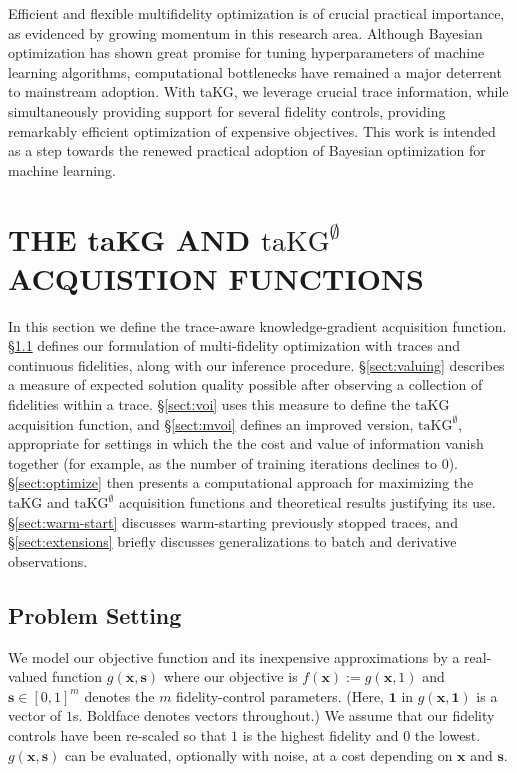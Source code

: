 \documentclass[letterpaper]{article}
\let\Section\S
\newcommand{\x}{\mathbf{x}}
\newcommand{\s}{\mathbf{s}}
\renewcommand{\S}{S}
\newcommand{\one}{\mathbf{1}}
\newcommand{\taKG}{\text{taKG}}
\newcommand{\taKGE}{\text{taKG}^\emptyset}
\numberwithin{equation}{section}
\newcommand{\sectn}[1]{\Section\ref{#1}}
\begin{document}

Efficient and flexible multifidelity optimization is of crucial practical importance, as evidenced by growing momentum in this research area. Although Bayesian optimization has shown great promise for tuning hyperparameters of machine learning algorithms, computational bottlenecks have remained a major deterrent to mainstream adoption. With taKG, we leverage crucial trace information, while simultaneously providing support for several fidelity controls, providing remarkably efficient optimization of expensive objectives. This work is intended as a step towards the renewed practical adoption of Bayesian optimization for machine learning.

\section{THE taKG AND $\taKGE$ ACQUISTION FUNCTIONS}
\label{sect:taKG}
In this section we define the trace-aware knowledge-gradient acquisition function.
\sectn{sec:obj} defines our formulation of multi-fidelity optimization with traces and continuous fidelities, along with our inference procedure.
\sectn{sect:valuing} describes a measure of expected solution quality possible after observing a collection of fidelities within a trace.
\sectn{sect:voi} uses this measure to define the $\taKG$ acquisition function,
and \sectn{sect:mvoi} defines an improved version, $\taKGE$, appropriate for settings in which the 
the cost and value of information vanish together (for example, as the number of training iterations declines to 0).
\sectn{sect:optimize} then presents a computational approach for maximizing the $\taKG$ and $\taKGE$ acquisition functions and theoretical results justifying its use.  \sectn{sect:warm-start} discusses warm-starting previously stopped traces, and \sectn{sect:extensions} briefly discusses generalizations to batch and derivative observations.

\subsection{Problem Setting}
\label{sec:obj}
We model our objective function and its inexpensive approximations by a real-valued function $g(\x, \s)$ where our objective is $f(\x) := g(\x, 1)$ and $\s \in [0,1]^m$ denotes the $m$ fidelity-control parameters.   (Here, $\one$ in $g(\x,\one)$ is a vector of $1$s.  Boldface denotes vectors throughout.)
We assume that our fidelity controls have been re-scaled so that $1$ is the highest fidelity and $0$ the lowest.  
$g(\x,\s)$ can be evaluated, optionally with noise, at a cost depending on $\x$ and $\s$. 
\end{document}
